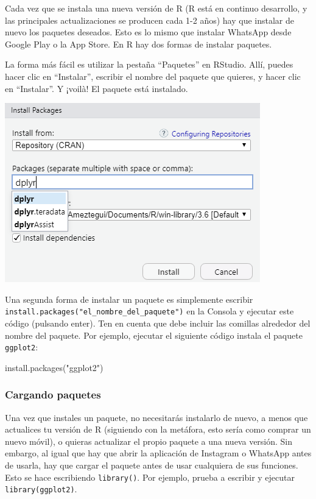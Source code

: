 \documentclass[
  letterpaper,
  DIV=11,
  numbers=noendperiod]{scrreprt}
\newenvironment{Shaded}{\begin{snugshade}}{\end{snugshade}}
\newcommand{\FunctionTok}[1]{\textcolor[rgb]{0.28,0.35,0.67}{#1}}
\newcommand{\NormalTok}[1]{\textcolor[rgb]{0.00,0.23,0.31}{#1}}
\newcommand{\StringTok}[1]{\textcolor[rgb]{0.13,0.47,0.30}{#1}}
\begin{document}
Cada vez que se instala una nueva versión de R (R está en continuo
desarrollo, y las principales actualizaciones se producen cada 1-2 años)
hay que instalar de nuevo los paquetes deseados. Esto es lo mismo que
instalar WhatsApp desde Google Play o la App Store. En R hay dos formas
de instalar paquetes.

La forma más fácil es utilizar la pestaña ``Paquetes'' en RStudio. Allí,
puedes hacer clic en ``Instalar'', escribir el nombre del paquete que
quieres, y hacer clic en ``Instalar''. Y ¡voilà! El paquete está
instalado.

\includegraphics{images/01-intro-r/package_install.PNG}

Una segunda forma de instalar un paquete es simplemente escribir
\texttt{install.packages("el\_nombre\_del\_paquete")} en la Consola y
ejecutar este código (pulsando enter). Ten en cuenta que debe incluir
las comillas alrededor del nombre del paquete. Por ejemplo, ejecutar el
siguiente código instala el paquete \texttt{ggplot2}:

\begin{Shaded}
\begin{Highlighting}[]
\FunctionTok{install.packages}\NormalTok{(}\StringTok{"ggplot2"}\NormalTok{)}
\end{Highlighting}
\end{Shaded}

\hypertarget{cargando-paquetes}{%
\subsubsection{Cargando paquetes}\label{cargando-paquetes}}

Una vez que instales un paquete, no necesitarás instalarlo de nuevo, a
menos que actualices tu versión de R (siguiendo con la metáfora, esto
sería como comprar un nuevo móvil), o quieras actualizar el propio
paquete a una nueva versión. Sin embargo, al igual que hay que abrir la
aplicación de Instagram o WhatsApp antes de usarla, hay que cargar el
paquete antes de usar cualquiera de sus funciones. Esto se hace
escribiendo \texttt{library()}. Por ejemplo, prueba a escribir y
ejecutar \texttt{library(ggplot2)}.
\end{document}
